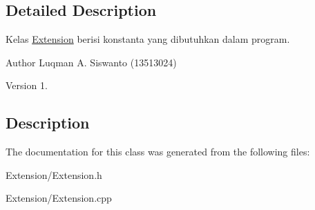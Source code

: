 \subsection{Detailed Description}
Kelas \hyperlink{class_extension}{Extension} berisi konstanta yang dibutuhkan dalam program. 

\begin{DoxyAuthor}{Author}
Luqman A. Siswanto (13513024) 
\end{DoxyAuthor}
\begin{DoxyVersion}{Version}
1.
\end{DoxyVersion}
\hypertarget{class_logger_Description}{}\subsection{Description}\label{class_logger_Description}


The documentation for this class was generated from the following files\+:\begin{DoxyCompactItemize}
\item 
Extension/Extension.\+h\item 
Extension/Extension.\+cpp\end{DoxyCompactItemize}
